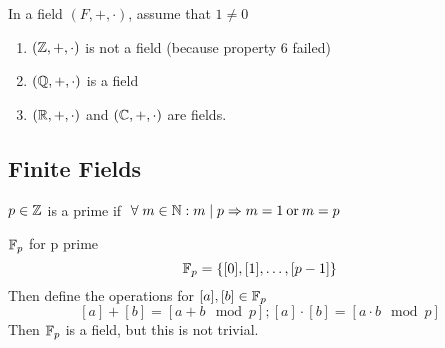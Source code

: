 \begin{remark}
    In a field \((F, +, \cdot)\), assume that \(1\neq 0\)
\end{remark}
\begin{example}
    \begin{enumerate}
        \item \((\mathbb{Z}, +, \cdot)\) is not a field (because property 6 failed)
        \item  \((\mathbb{Q}, +, \cdot)\) is a field
        \item \((\mathbb{R}, +, \cdot)\) and \((\mathbb{C}, +, \cdot)\) are fields.
    \end{enumerate}
\end{example}

\subsection{Finite Fields}
\begin{recall}
    \(p\in \mathbb{Z}\) is a prime if \(\forall m\in \bbn: m \mid p \implies m = 1 \:\text{or}\:  m = p\)
\end{recall}
\begin{definition} {\(\mathbb{F}_p\) for p prime}
    \[
        \mathbb{F}_p = \{[0], [1], \dots, [p-1]\}
    \]
    Then define the operations for \([a], [b] \in \mathbb{F}_p\)
    \[
        [a] + [b] = [a + b \mod p]; [a] \cdot [b] = [a \cdot b \mod p]
    \]
    Then \(\mathbb{F}_p\) is a field, but this is not trivial.
\end{definition}

